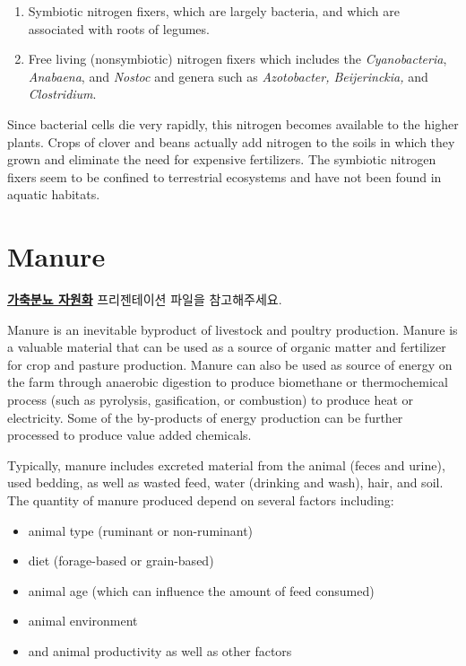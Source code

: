 \documentclass[]{book}
\providecommand{\tightlist}{%
  \setlength{\itemsep}{0pt}\setlength{\parskip}{0pt}}
\begin{document}
\begin{enumerate}
\def\labelenumi{\arabic{enumi}.}
\item
  Symbiotic nitrogen fixers, which are largely bacteria, and which are
  associated with roots of legumes.
\item
  Free living (nonsymbiotic) nitrogen fixers which includes the
  \emph{Cyanobacteria}, \emph{Anabaena}, and \emph{Nostoc} and genera
  such as \emph{Azotobacter, Beijerinckia,} and \emph{Clostridium}.
\end{enumerate}

Since bacterial cells die very rapidly, this nitrogen becomes available
to the higher plants. Crops of clover and beans actually add nitrogen to
the soils in which they grown and eliminate the need for expensive
fertilizers. The symbiotic nitrogen fixers seem to be confined to
terrestrial ecosystems and have not been found in aquatic habitats.

\chapter{Manure}\label{manure}

\textbf{\href{https://drive.google.com/file/d/1zayyDJWH9KQ0vKPsu2tNeH75u-USbIFv/view?usp=sharing}{가축분뇨
자원화}} 프리젠테이션 파일을 참고해주세요.

Manure is an inevitable byproduct of livestock and poultry production.
Manure is a valuable material that can be used as a source of organic
matter and fertilizer for crop and pasture production. Manure can also
be used as source of energy on the farm through anaerobic digestion to
produce biomethane or thermochemical process (such as pyrolysis,
gasification, or combustion) to produce heat or electricity. Some of the
by-products of energy production can be further processed to produce
value added chemicals.

Typically, manure includes excreted material from the animal (feces and
urine), used bedding, as well as wasted feed, water (drinking and wash),
hair, and soil. The quantity of manure produced depend on several
factors including:

\begin{itemize}
\tightlist
\item
  animal type (ruminant or non-ruminant)
\item
  diet (forage-based or grain-based)
\item
  animal age (which can influence the amount of feed consumed)
\item
  animal environment
\item
  and animal productivity as well as other factors
\end{itemize}
\end{document}
